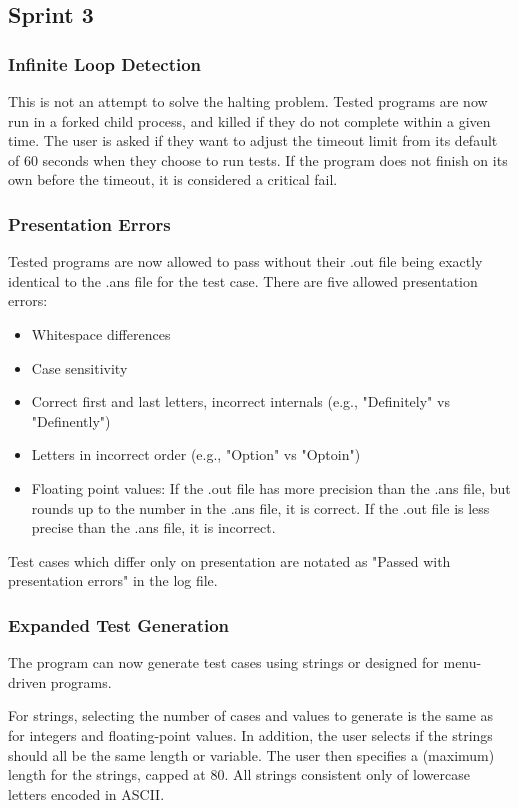 \subsection{Sprint 3}

\subsubsection{Infinite Loop Detection}
This is not an attempt to solve the halting problem. Tested programs are now run in a forked child process, and killed if they do not complete within a given time. The user is asked if they want to adjust the timeout limit from its default of 60 seconds when they choose to run tests. If the program does not finish on its own before the timeout, it is considered a critical fail.

\subsubsection{Presentation Errors}
Tested programs are now allowed to pass without their .out file being exactly identical to the .ans file for the test case. There are five allowed presentation errors:
\begin{itemize}
\item Whitespace differences
\item Case sensitivity
\item Correct first and last letters, incorrect internals (e.g., "Definitely" vs "Definently") 
\item Letters in incorrect order (e.g., "Option" vs "Optoin")
\item Floating point values: If the .out file has more precision than the .ans file, but rounds up to the number in the .ans file, it is correct. If the .out file is less precise than the .ans file, it is incorrect.
\end{itemize}

Test cases which differ only on presentation are notated as "Passed with presentation errors" in the log file.

\subsubsection{Expanded Test Generation}
The program can now generate test cases using strings or designed for menu-driven programs.

For strings, selecting the number of cases and values to generate is the same as for integers and floating-point values. In addition, the user selects if the strings should all be the same length or variable. The user then specifies a (maximum) length for the strings, capped at 80. All strings consistent only of lowercase letters encoded in ASCII.

